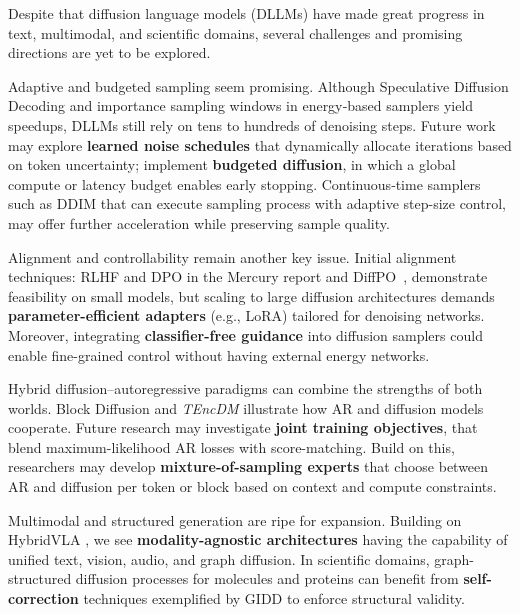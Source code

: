 Despite that diffusion language models (DLLMs) have made great progress in text, multimodal, and scientific domains, several challenges and promising directions are yet to be explored.



Adaptive and budgeted sampling seem promising. Although Speculative Diffusion Decoding \cite{christopher_speculative_2025} and importance sampling windows in energy‐based samplers \cite{xu_energy-based_2025} yield speedups, DLLMs still rely on tens to hundreds of denoising steps. Future work may explore \textbf{learned noise schedules} that dynamically allocate iterations based on token uncertainty; implement \textbf{budgeted diffusion}, in which a global compute or latency budget enables early stopping. Continuous‐time samplers such as DDIM \cite{song_denoising_2020} that can execute sampling process with adaptive step-size control, may offer further acceleration while preserving sample quality.



Alignment and controllability remain another key issue. Initial alignment techniques: RLHF and DPO in the Mercury report \cite{labs2025mercuryultrafastlanguagemodels} and DiffPO~\cite{chen_diffpo_2025}, demonstrate feasibility on small models, but scaling to large diffusion architectures demands \textbf{parameter-efficient adapters} (e.g., LoRA) tailored for denoising networks. Moreover, integrating \textbf{classifier-free guidance} \cite{ho_classifier-free_2022} into diffusion samplers could enable fine-grained control without having external energy networks.



Hybrid diffusion–autoregressive paradigms can combine the strengths of both worlds. Block Diffusion \cite{arriola_block_2025} and \emph{TEncDM} \cite{shabalin_tencdm_2025} illustrate how AR and diffusion models cooperate. Future research may investigate \textbf{joint training objectives}, that blend maximum-likelihood AR losses with score-matching. Build on this, researchers may develop \textbf{mixture-of-sampling experts} that choose between AR and diffusion per token or block based on context and compute constraints.



Multimodal and structured generation are ripe for expansion. Building on HybridVLA \cite{liu_hybridvla_2025}, we see \textbf{modality-agnostic architectures} having the capability of unified text, vision, audio, and graph diffusion. In scientific domains, graph-structured diffusion processes for molecules \cite{rutte_generalized_2025} and proteins \cite{gao_diffsds_2023} can benefit from \textbf{self-correction} techniques exemplified by GIDD \cite{rutte_generalized_2025} to enforce structural validity.



